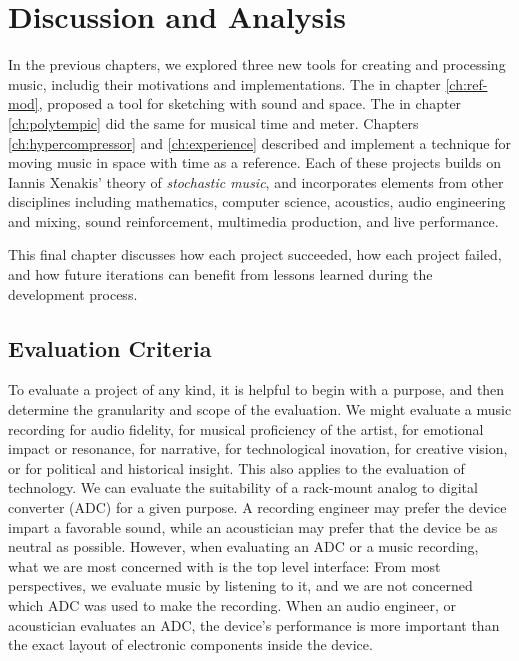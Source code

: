 \clearpage
\chapter{Discussion and Analysis}
\label{ch:analysis}
In the previous chapters, we explored three new tools for creating and
processing music, includig their motivations and implementations. The
 in chapter \ref{ch:ref-mod}, proposed a tool for sketching
with sound and space. The \polytempic in chapter \ref{ch:polytempic}
did the same for musical time and meter. Chapters
\ref{ch:hypercompressor} and \ref{ch:experience} described and
implement a technique for moving music in space with time as a
reference. Each of these projects builds on Iannis Xenakis' theory of
\textit{stochastic music}, and incorporates elements from other
disciplines including mathematics, computer science, acoustics, audio
engineering and mixing, sound reinforcement, multimedia production,
and live performance.

This final chapter discusses how each project succeeded, how each
project failed, and how future iterations can benefit from lessons
learned during the development process.

\section{Evaluation Criteria}
\label{sec:eval-criteria}
To evaluate a project of any kind, it is helpful to begin with a
purpose, and then determine the granularity and scope of the
evaluation.\cite{Saltzer2009} We might evaluate a music recording for
audio fidelity, for musical proficiency of the artist, for emotional
impact or resonance, for narrative, for technological inovation, for
creative vision, or for political and historical insight. This also
applies to the evaluation of technology.  We can evaluate the
suitability of a rack-mount analog to digital converter (ADC) for a
given purpose. A recording engineer may prefer the device impart a
favorable sound, while an acoustician may prefer that the device be
as neutral as possible. However, when evaluating an ADC or a music
recording, what we are most concerned with is the top level interface:
From most perspectives, we evaluate music by listening to it, and we
are not concerned which ADC was used to make the recording. When an
audio engineer, or acoustician evaluates an ADC, the device's
performance is more important than the exact layout of electronic
components inside the device.

